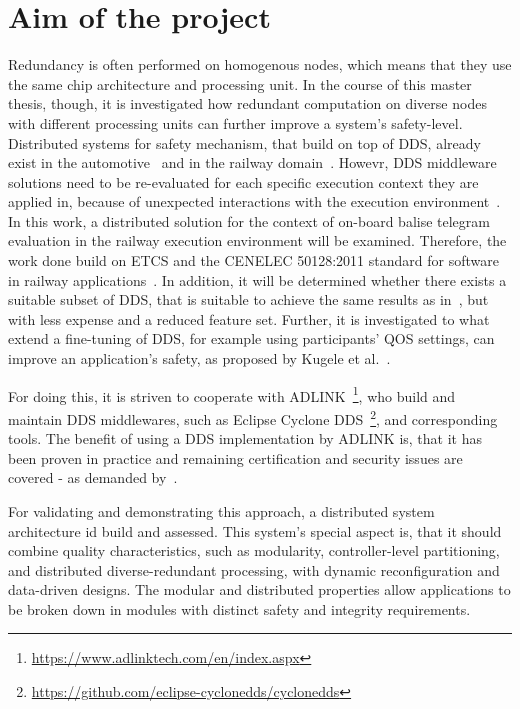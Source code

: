 \documentclass[a4paper, 12pt]{scrartcl}
\begin{document}
\section*{Aim of the project}
Redundancy is often performed on homogenous nodes, which means that they use the same chip architecture and processing unit.
In the course of this master thesis, though, it is investigated how redundant computation on diverse nodes with different processing units can further improve a system's safety-level.
Distributed systems for safety mechanism, that build on top of \ac{DDS}, already exist in the automotive~\cite{DistributedSafety2020} and in the railway domain~\cite{DDSInURail}.
Howevr, \ac{DDS} middleware solutions need to be re-evaluated for each specific execution context they are applied in, because of unexpected interactions with the execution environment~\cite{CotroneoDDSFailureAnalysis}.
In this work, a distributed solution for the context of on-board balise telegram evaluation in the railway execution environment will be examined.
Therefore, the work done build on \ac{ETCS} and the CENELEC 50128:2011 standard for software in railway applications~\cite{BoulangerStandards}.
In addition, it will be determined whether there exists a suitable subset of \ac{DDS}, that is suitable to achieve the same results as in~\cite{DistributedSafety2020}, but with less expense and a reduced feature set.
Further, it is investigated to what extend a fine-tuning of \ac{DDS}, for example using participants' \ac{QOS} settings, can improve an application's safety, as proposed by Kugele et al.~\cite{KugeleDataCentricForAuto}.

For doing this, it is striven to cooperate with ADLINK~\footnote{\url{https://www.adlinktech.com/en/index.aspx}}, who build and maintain \ac{DDS} middlewares, such as Eclipse Cyclone DDS~\footnote{\url{https://github.com/eclipse-cyclonedds/cyclonedds}}, and corresponding tools.
The benefit of using a \ac{DDS} implementation by ADLINK is, that it has been proven in practice and remaining certification and security issues are covered - as demanded by~\cite{KugeleDataCentricForAuto}.

For validating and demonstrating this approach, a distributed system architecture id build and assessed.
This system's special aspect is, that it should combine quality characteristics, such as modularity, control\-ler-level partitioning, and distributed diverse-redundant processing, with dynamic reconfiguration and data-driven designs.
The modular and distributed properties allow applications to be broken down in modules with distinct safety and integrity requirements.
\end{document}
